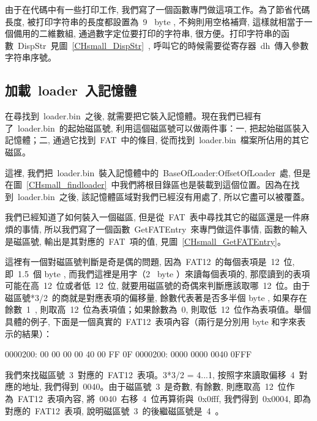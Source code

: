 由于在代碼中有一些打印工作, 我們寫了一個函數專門做這項工作。為了節省代碼長度, 被打印字符串的長度都設置為~9~ byte , 不夠則用空格補齊, 這樣就相當于一個備用的二維數組, 通過數字定位要打印的字符串, 很方便。打印字符串的函數~DispStr~見圖~\ref{CHsmall_DispStr}~, 呼叫它的時候需要從寄存器~dh~傳入參數字符串序號。

\label{CHsmall_DispStr}

\subsection{加載~loader~入記憶體}

在尋找到~loader.bin~之後, 就需要把它裝入記憶體。現在我們已經有了~loader.bin~的起始磁區號, 利用這個磁區號可以做兩件事：一, 把起始磁區裝入記憶體；二, 通過它找到~FAT~中的條目, 從而找到~loader.bin~檔案所佔用的其它磁區。

這裡, 我們把~loader.bin~裝入記憶體中的~BaseOfLoader:OffsetOfLoader~處, 但是在圖~\ref{CHsmall_findloader}~中我們將根目錄區也是裝載到這個位置。因為在找到~loader.bin~之後, 該記憶體區域對我們已經沒有用處了, 所以它盡可以被覆蓋。

我們已經知道了如何裝入一個磁區, 但是從~FAT~表中尋找其它的磁區還是一件麻煩的事情, 所以我們寫了一個函數~GetFATEntry~來專門做這件事情, 函數的輸入是磁區號, 輸出是其對應的~FAT~項的值, 見圖~\ref{CHsmall_GetFATEntry}。

\label{CHsmall_GetFATEntry}

這裡有一個對磁區號判斷是奇是偶的問題, 因為~FAT12~的每個表項是~12~位, 即~1.5~個 byte , 而我們這裡是用字（2~ byte ）來讀每個表項的, 那麼讀到的表項可能在高~12~位或者低~12~位, 就要用磁區號的奇偶來判斷應該取哪~12~位。由于磁區號*3/2~的商就是對應表項的偏移量, 餘數代表著是否多半個 byte , 如果存在餘數~1~, 則取高~12~位為表項值；如果餘數為~0, 則取低~12~位作為表項值。舉個具體的例子, 下面是一個真實的~FAT12~表項內容（兩行是分別用 byte 和字來表示的結果）：
\begin{Command}
0000200: 00 00 00 00 40 00 FF 0F
0000200:  0000  0000  0040  0FFF
\end{Command}
我們來找磁區號~3~對應的~FAT12~表項。3*3/2 = 4...1, 按照字來讀取偏移~4~對應的地址, 我們得到~0040。由于磁區號~3~是奇數, 有餘數, 則應取高~12~位作為~FAT12~表項內容, 將~0040~右移~4~位再算術與~0x0fff, 我們得到~0x0004, 即為對應的~FAT12~表項, 說明磁區號~3~的後繼磁區號是~4~。

